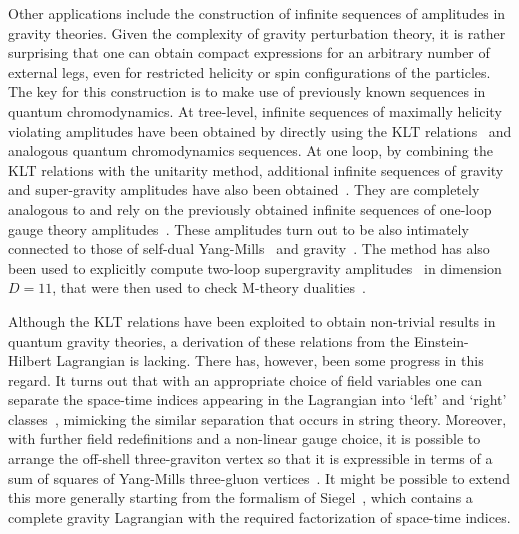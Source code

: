 \documentclass[12pt]{livrev}
\begin{document}
Other applications include the construction of infinite sequences of
amplitudes in gravity theories.  Given the complexity of gravity
perturbation theory, it is rather surprising that one can obtain
compact expressions for an arbitrary number of external legs, even 
for restricted helicity or spin configurations of the particles.  The
key for this construction is to make use of previously known sequences
in quantum chromodynamics. At tree-level, infinite sequences of
maximally helicity violating amplitudes have been obtained by directly
using the KLT relations~\cite{BGK,Square} and analogous quantum
chromodynamics sequences.  At one loop, by combining the KLT relations
with the unitarity method, additional infinite sequences of gravity
and super-gravity amplitudes have also been
obtained~\cite{AllPlusGrav,MHVGrav}.  They are completely analogous to
and rely on the previously obtained infinite sequences of one-loop
gauge theory
amplitudes~\cite{AllPlusGauge,Bern94SusyFour,Bern95SusyFour}.  These
amplitudes turn out to be also intimately connected to those of
self-dual
Yang-Mills~\cite{Yang77,DuffIsham80,Lenzov87,Lenzov88,Bardeen96,
Cangemi,ChalmersSiegel} and
gravity~\cite{Plebanski75,Duff79,Plebanski96}.  The method has also
been used to explicitly compute two-loop supergravity
amplitudes~\cite{BDDPR} in dimension $D=11$, that were then used to
check M-theory dualities~\cite{GreenTwoLoop}.

Although the KLT relations have been exploited to obtain non-trivial
results in quantum gravity theories, a derivation of these relations
from the Einstein-Hilbert Lagrangian is lacking.  There has, however,
been some progress in this regard.  It turns out that with an
appropriate choice of field variables one can separate the space-time
indices appearing in the Lagrangian into `left' and `right'
classes~\cite{Siegel93A,Siegel93B,Siegel94,BernGrant}, mimicking the similar
separation that occurs in string theory.  Moreover, with further field
redefinitions and a non-linear gauge choice, it is possible to arrange
the off-shell three-graviton vertex so that it is expressible in terms
of a sum of squares of Yang-Mills three-gluon
vertices~\cite{BernGrant}.  It might be possible to extend this 
more generally starting from the formalism of
Siegel~\cite{Siegel93A,Siegel93B,Siegel94}, which contains a complete gravity
Lagrangian with the required factorization of space-time indices.
\end{document}
